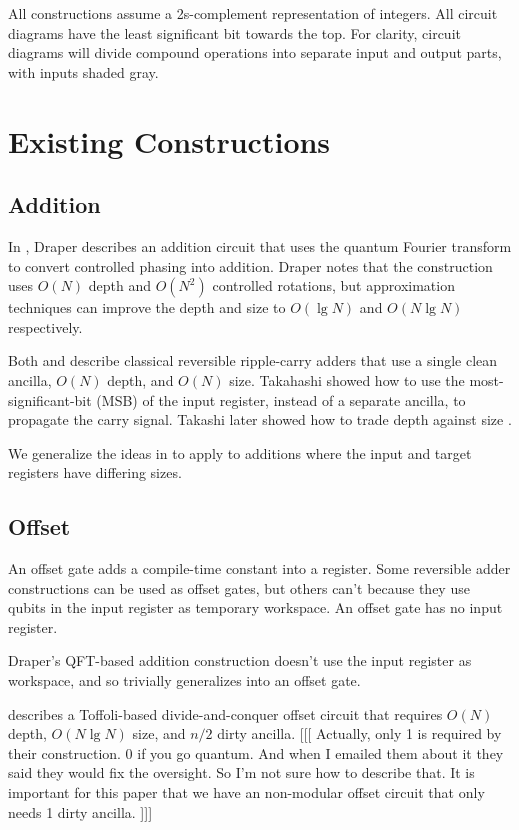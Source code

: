 \documentclass[twocolumn]{article}
\begin{document}
All constructions assume a 2s-complement representation of integers.
All circuit diagrams have the least significant bit towards the top.
For clarity, circuit diagrams will divide compound operations into separate input and output parts, with inputs shaded gray.

\section{Existing Constructions} \label{sec:review}

\subsection{Addition}

In \cite{draper2000}, Draper describes an addition circuit that uses the quantum Fourier transform to convert controlled phasing into addition.
Draper notes that the construction uses $O(N)$ depth and $O(N^2)$ controlled rotations, but approximation techniques \cite{barenco1996} \cite{cleve2000} can improve the depth and size to $O(\lg N)$ and $O(N \lg N)$ respectively.

Both \cite{cuccaro2004} and \cite{van2004} describe classical reversible ripple-carry adders that use a single clean ancilla, $O(N)$ depth, and $O(N)$ size.
Takahashi \cite{takahashi2005} showed how to use the most-significant-bit (MSB) of the input register, instead of a separate ancilla, to propagate the carry signal.
Takashi later showed how to trade depth against size \cite{takahashi2009}.

We generalize the ideas in \cite{takahashi2005} to apply to additions where the input and target registers have differing sizes.

\subsection{Offset}

An offset gate adds a compile-time constant into a register.
Some reversible adder constructions can be used as offset gates, but others can't because they use qubits in the input register as temporary workspace.
An offset gate has no input register.

Draper's QFT-based addition construction \cite{draper2000} doesn't use the input register as workspace, and so trivially generalizes into an offset gate.

\cite{haner2016} describes a Toffoli-based divide-and-conquer offset circuit that requires $O(N)$ depth, $O(N \lg N)$ size, and $n/2$ dirty ancilla.
[[[ Actually, only 1 is required by their construction. 0 if you go quantum. And when I emailed them about it they said they would fix the oversight. So I'm not sure how to describe that. It is important for this paper that we have an non-modular offset circuit that only needs 1 dirty ancilla. ]]]
\end{document}
